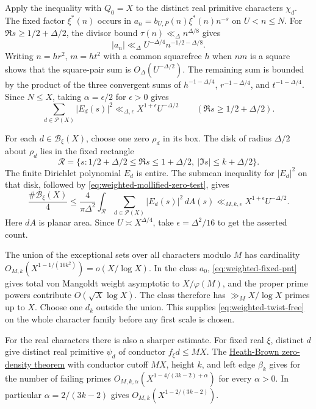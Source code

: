 Apply the inequality with \(Q_0=X\) to the distinct real primitive
characters \(\chi_d\). The fixed factor \(\xi^*(n)\) occurs in
\(a_n=b_{U,P}(n)\xi^*(n)n^{-s}\) on \(U<n\le N\).
For \(\Re s\ge1/2+\Delta/2\), the divisor bound
\(\tau(n)\ll_\Delta n^{\Delta/8}\) gives
\[
 |a_n|\ll_\Delta U^{-\Delta/4} n^{-1/2-\Delta/8}.
\]
Writing \(n=h r^2\), \(m=h t^2\) with a common squarefree \(h\) when
\(nm\) is a square shows that the square-pair sum is
\(O_\Delta(U^{-\Delta/2})\). The remaining sum is bounded by the
product of the three convergent sums of \(h^{-1-\Delta/4}\),
\(r^{-1-\Delta/4}\), and \(t^{-1-\Delta/4}\). Since \(N\le X\),
taking \(\alpha=\epsilon/2\) for \(\epsilon>0\) gives
\[
 \sum_{d\in\mathcal P(X)}|E_d(s)|^2
      \ll_{\Delta,\epsilon} X^{1+\epsilon} U^{-\Delta/2}
 \qquad (\Re s\ge1/2+\Delta/2).
\]

For each \(d\in\mathcal B_\xi(X)\), choose one zero \(\rho_d\) in its
box. The disk of radius \(\Delta/2\) about \(\rho_d\) lies in the fixed
rectangle
\[
 \mathcal R=\bigl\{s:1/2+\Delta/2\le\Re s\le1+\Delta/2,\
                          |\Im s|\le k+\Delta/2\bigr\}.
\]
The finite Dirichlet polynomial \(E_d\) is entire. The submean inequality
for \(|E_d|^2\) on that disk, followed by \eqref{eq:weighted-mollified-zero-test}, gives
\[
 \frac{\#\mathcal B_\xi(X)}4
 \le \frac{4}{\pi\Delta^2}
       \int_{\mathcal R}\sum_{d\in\mathcal P(X)}|E_d(s)|^2\,dA(s)
 \ll_{M,k,\epsilon} X^{1+\epsilon}U^{-\Delta/2}.
\]
Here \(dA\) is planar area. Since \(U\asymp X^{\Delta/4}\), take
\(\epsilon=\Delta^2/16\) to get the asserted count.

%
The union of the exceptional sets over all characters modulo \(M\)
has cardinality \(O_{M,k}(X^{1-1/(16k^2)})=o(X/\log X)\).
In the class \(a_0\), \eqref{eq:weighted-fixed-pnt} gives total von
Mangoldt weight asymptotic to \(X/\varphi(M)\), and the proper prime
powers contribute \(O(\sqrt X\log X)\). The class therefore has
\(\gg_M X/\log X\) primes up to \(X\). Choose one \(d_k\) outside the
union. This supplies \eqref{eq:weighted-twist-free} on the whole
character family before any first scale is chosen.

%
For the real characters there is also a sharper estimate. For fixed
real \(\xi\), distinct \(d\) give distinct real primitive \(\psi_d\)
of conductor \(f_\xi d\le MX\). The
\hyperlink{proof.real-character-zero-density}{Heath-Brown zero-density
theorem} with conductor cutoff \(MX\), height \(k\), and left edge
\(\beta_k\) gives for the number of failing primes
\(O_{M,k,\alpha}(X^{1-4/(3k-2)+\alpha})\) for every \(\alpha>0\).
In particular \(\alpha=2/(3k-2)\) gives
\(O_{M,k}(X^{1-2/(3k-2)})\).
\cite[Corollary~1 and Theorem~3]{f1heath-brown}

